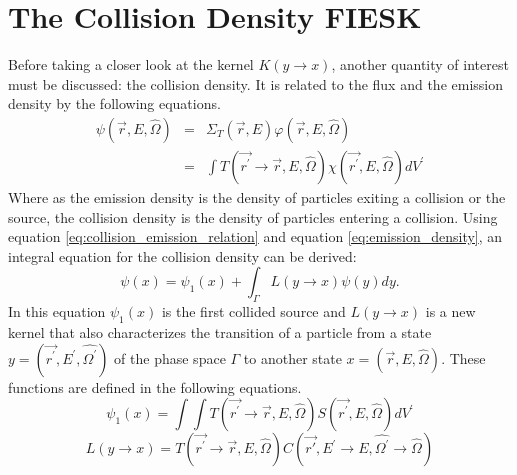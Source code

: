 \section{The Collision Density FIESK}
Before taking a closer look at the kernel $K(y \to x)$, another quantity of 
interest must be discussed: the collision density. It is related to the
flux and the emission density by the following equations.
\begin{eqnarray}
  \psi(\vec{r},E,\hat{\Omega}) & = & \Sigma_T(\vec{r},E)
  \varphi(\vec{r},E,\hat{\Omega}) \\
  & = & \int T(\vec{r^{'}} \to \vec{r},E,\hat{\Omega})
  \chi(\vec{r^{'}},E,\hat{\Omega})dV^{'}
  \label{eq:collision_emission_relation}
\end{eqnarray}
Where as the emission density is the density of particles exiting a collision
or the source, the collision density is the density of particles entering a 
collision. Using equation \ref{eq:collision_emission_relation} and equation
\ref{eq:emission_density}, an integral equation for the 
collision density can be derived:
\begin{equation*}
  \psi(x) = \psi_1(x) + \int_{\Gamma} L(y \to x)\psi(y)dy.
\end{equation*}
In this equation $\psi_1(x)$ is the first collided source and $L(y \to x)$ is
a new kernel that also characterizes the transition of a particle from a state 
$y = (\vec{r^{'}},E^{'},\hat{\Omega^{'}})$ of the phase space $\Gamma$ to another 
state $x = (\vec{r},E,\hat{\Omega})$. These functions are defined in the 
following equations.
\begin{equation}
  \psi_1(x) = \int\int T(\vec{r^{'}} \to \vec{r},E,\hat{\Omega})
  S(\vec{r^{'}},E,\hat{\Omega})dV^{'}
\end{equation}
\begin{equation}
  L(y \to x) =
  T(\vec{r^{'}} \to \vec{r},E,\hat{\Omega})
  C(\vec{r'},E^{'} \to E,\hat{\Omega^{'}} \to \hat{\Omega})
\end{equation}

